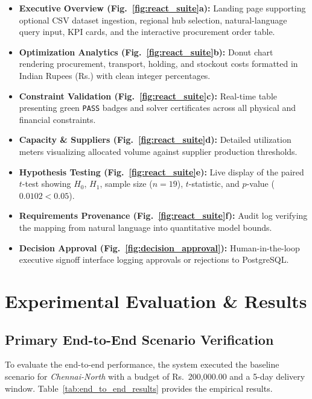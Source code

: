 \documentclass[conference]{IEEEtran}
\begin{document}
\begin{itemize}
    \item \textbf{Executive Overview (Fig.~\ref{fig:react_suite}a):} Landing page supporting optional CSV dataset ingestion, regional hub selection, natural-language query input, KPI cards, and the interactive procurement order table.
    \item \textbf{Optimization Analytics (Fig.~\ref{fig:react_suite}b):} Donut chart rendering procurement, transport, holding, and stockout costs formatted in Indian Rupees (Rs.) with clean integer percentages.
    \item \textbf{Constraint Validation (Fig.~\ref{fig:react_suite}c):} Real-time table presenting green \texttt{PASS} badges and solver certificates across all physical and financial constraints.
    \item \textbf{Capacity \& Suppliers (Fig.~\ref{fig:react_suite}d):} Detailed utilization meters visualizing allocated volume against supplier production thresholds.
    \item \textbf{Hypothesis Testing (Fig.~\ref{fig:react_suite}e):} Live display of the paired $t$-test showing $H_0$, $H_1$, sample size ($n=19$), $t$-statistic, and $p$-value ($0.0102 < 0.05$).
    \item \textbf{Requirements Provenance (Fig.~\ref{fig:react_suite}f):} Audit log verifying the mapping from natural language into quantitative model bounds.
    \item \textbf{Decision Approval (Fig.~\ref{fig:decision_approval}):} Human-in-the-loop executive signoff interface logging approvals or rejections to PostgreSQL.
\end{itemize}

\section{Experimental Evaluation \& Results}
\subsection{Primary End-to-End Scenario Verification}
To evaluate the end-to-end performance, the system executed the baseline scenario for \textit{Chennai-North} with a budget of Rs.~200,000.00 and a 5-day delivery window. Table~\ref{tab:end_to_end_results} provides the empirical results.
\end{document}
